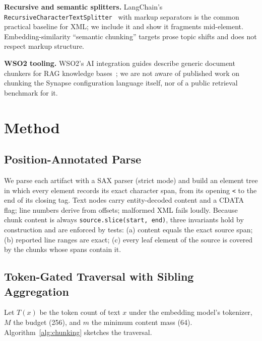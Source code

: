 \documentclass[conference]{IEEEtran}
\begin{document}
\textbf{Recursive and semantic splitters.} LangChain's \texttt{RecursiveCharacterTextSplitter}~\cite{langchain} with markup separators is the common practical baseline for XML; we include it and show it fragments mid-element. Embedding-similarity ``semantic chunking'' targets prose topic shifts and does not respect markup structure.

\textbf{WSO2 tooling.} WSO2's AI integration guides describe generic document chunkers for RAG knowledge bases~\cite{wso2rag}; we are not aware of published work on chunking the Synapse configuration language itself, nor of a public retrieval benchmark for it.

\section{Method}\label{sec:method}

\subsection{Position-Annotated Parse}
We parse each artifact with a SAX parser (strict mode) and build an element tree in which every element records its exact character span, from its opening \texttt{<} to the end of its closing tag. Text nodes carry entity-decoded content and a CDATA flag; line numbers derive from offsets; malformed XML fails loudly. Because chunk content is always \texttt{source.slice(start, end)}, three invariants hold by construction and are enforced by tests: (a) content equals the exact source span; (b) reported line ranges are exact; (c) every leaf element of the source is covered by the chunks whose spans contain it.

\subsection{Token-Gated Traversal with Sibling Aggregation}
Let $T(x)$ be the token count of text $x$ under the embedding model's tokenizer, $M$ the budget (256), and $m$ the minimum content mass (64). Algorithm~\ref{alg:chunking} sketches the traversal.
\end{document}
